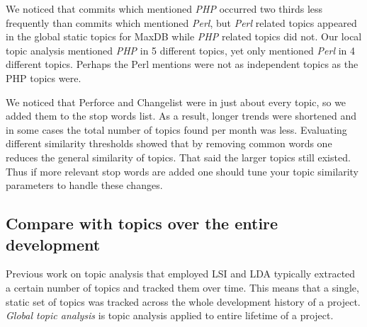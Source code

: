 \documentclass[times, 10pt,twocolumn]{article}
\newcommand{\shrinkit}{\vspace*{-.3em}}
\begin{document}
We noticed that commits which mentioned \emph{PHP} occurred two thirds
less frequently than commits which mentioned \emph{Perl}, but
\emph{Perl} related topics appeared in the global static topics for
MaxDB while \emph{PHP} related topics did not.  Our local topic
analysis mentioned \emph{PHP} in 5 different topics, yet only
mentioned \emph{Perl} in 4 different topics. Perhaps the Perl mentions
were not as independent topics as the PHP topics were.

We noticed that Perforce and Changelist were in just about every
topic, so we added them to the stop words list. As a result, longer
trends were shortened and in some cases the total number of topics
found per month was less.  Evaluating different similarity thresholds
showed that by removing common words one reduces the general
similarity of topics. That said the larger topics still existed. Thus
if more relevant stop words are added one should tune your topic
similarity parameters to handle these changes.
















\shrinkit
\subsection{Compare with topics over the entire development}
\shrinkit





Previous work on topic analysis that employed LSI and LDA typically
extracted a certain number of topics and tracked them over time. This
means that a single, static set of topics was tracked across the whole
development history of a project. \emph{Global topic analysis} is
topic analysis applied to entire lifetime of a project.
\end{document}
